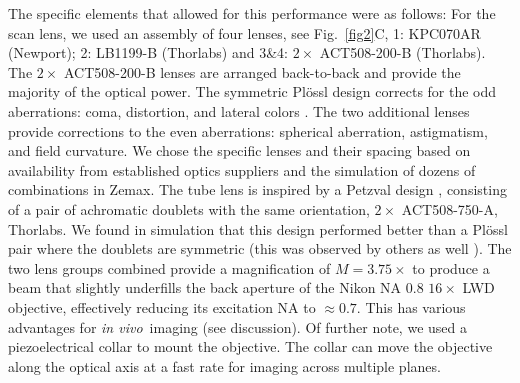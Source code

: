 \documentclass[10pt,letterpaper]{article}
\newcommand{\invivo}{\textit{in vivo}~}
\begin{document}
The specific elements that allowed for this performance were as follows: For the scan lens, we used an assembly of four lenses, see Fig.~\ref{fig2}C, 1: KPC070AR (Newport); 2: LB1199-B (Thorlabs) and 3\&4: $2\times$ ACT508-200-B (Thorlabs). The $2\times$ ACT508-200-B lenses are arranged back-to-back and provide the majority of the optical power. The symmetric Pl\"ossl design corrects for the odd aberrations: coma, distortion, and lateral colors \cite{Negrean2014, Kidger2001}. The two additional lenses provide corrections to the even aberrations: spherical aberration, astigmatism, and field curvature. We chose the specific lenses and their spacing based on availability from established optics suppliers and the simulation of dozens of combinations in Zemax. The tube lens is inspired by a Petzval design \cite{Smith2007, Kidger2001}, consisting of a pair of achromatic doublets with the same orientation, $2\times$ ACT508-750-A, Thorlabs. We found in simulation that this design performed better than a Pl\"ossl pair where the doublets are symmetric (this was observed by others as well \cite{Hong2022, Bumstead2018, Mayrhofer2015}).\newline
The two lens groups combined provide a magnification of $M=3.75\times$ to produce a beam that slightly underfills the back aperture of the Nikon NA 0.8 $16\times$ LWD objective, effectively reducing its excitation NA to $\approx0.7$. This has various advantages for \invivo imaging (see discussion). Of further note, we used a piezoelectrical collar to mount the objective. The collar can move the objective along the optical axis at a fast rate for imaging across multiple planes. 
\end{document}
